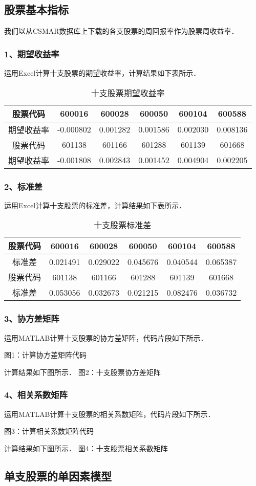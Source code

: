 


\subsection{股票基本指标}
我们以从CSMAR数据库上下载的各支股票的周回报率作为股票周收益率．

\subsubsection{1、期望收益率}
运用Excel计算十支股票的期望收益率，计算结果如下表所示．

\begin{table}[ht]
\centering
\caption{十支股票期望收益率}\label{inv1_tab1}
\begin{tabular}{|c|c|c|c|c|c|}
\hline
股票代码 &600016 & 600028 & 600050 & 600104 &	600588 \\
\hline
期望收益率 &-0.000802&0.001282&0.001586&0.002030&0.008136\\
\hline
股票代码 &601138&601166&601288&601139&601668\\
\hline
期望收益率&-0.001808&0.002843&0.001452&0.004904&0.002205\\
\hline
\end{tabular}
\end{table}

\subsubsection{2、标准差}
运用Excel计算十支股票的标准差，计算结果如下表所示．

\begin{table}[ht]
\centering
\caption{十支股票标准差}\label{inv1_tab2}
\begin{tabular}{|c|c|c|c|c|c|}
\hline
股票代码 &600016 & 600028 & 600050 & 600104 &	600588 \\
\hline
标准差 &0.021491&0.029022&0.045676&0.040544	&0.065387\\
\hline
股票代码 &601138&601166&601288&601139&601668\\
\hline
标准差&0.053056&0.032673&0.021215&	0.082476&0.036732\\
\hline
\end{tabular}
\end{table}
\subsubsection{3、协方差矩阵}
运用MATLAB计算十支股票的协方差矩阵，代码片段如下所示．

图1：计算协方差矩阵代码

计算结果如下图所示．
图2：十支股票协方差矩阵

\subsubsection{4、相关系数矩阵}
运用MATLAB计算十支股票的相关系数矩阵，代码片段如下所示．

图3：计算相关系数矩阵代码

计算结果如下图所示．
图4：十支股票相关系数矩阵

\subsection{单支股票的单因素模型}
